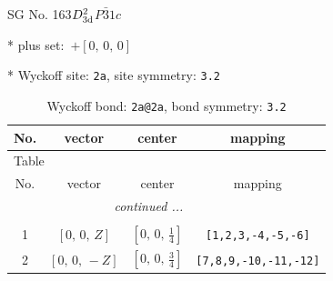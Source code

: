 \documentclass[fleqn,8pt]{jsarticle}
\begin{document}
\setcounter{MaxMatrixCols}{32}

\renewcommand{\tablename}{Table~}
\renewcommand{\figurename}{Figure~}
\begin{center}
\LARGE
SG No. 163\quad$D_{\rm 3d}^{2}$\quad$P\bar{3}1c$\quad[ trigonal ]
\end{center}

* plus set:\,\,\,$+\left[ 0,\, 0,\, 0 \right]$


* Wyckoff site: {\tt 2a}, site symmetry: {\tt 3.2}
\renewcommand{\arraystretch}{1.2}
\begin{longtable}{cccc}
\caption{Wyckoff bond: {\tt 2a@2a}, bond symmetry: {\tt 3.2}}
 \\
 \hline \hline
No. & vector & center & mapping \\ \hline \endfirsthead

\multicolumn{3}{l}{\tablename\ \thetable{}} \\
 \hline \hline
No. & vector & center & mapping \\ \hline \endhead

 \hline \hline
\multicolumn{3}{r}{\footnotesize\it continued ...} \\ \endfoot

 \hline \hline
\multicolumn{3}{r}{} \\ \endlastfoot

1 & $\left[ 0,\, 0,\, Z \right]$ & $\left[ 0,\, 0,\, \frac{1}{4} \right]$ & {\tt [1,2,3,-4,-5,-6]} \\ \hline
2 & $\left[ 0,\, 0,\, - Z \right]$ & $\left[ 0,\, 0,\, \frac{3}{4} \right]$ & {\tt [7,8,9,-10,-11,-12]} \\
\end{longtable}
\renewcommand{\arraystretch}{1.2}
\end{document}
